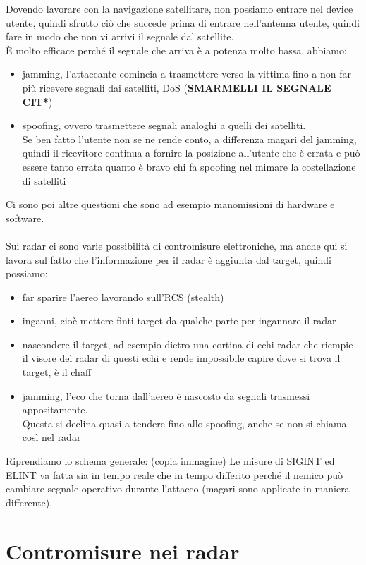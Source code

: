 \documentclass[oneside, 12pt]{extbook}
\begin{document}
Dovendo lavorare con la navigazione satellitare, non possiamo entrare nel device utente, quindi sfrutto ciò che succede prima di entrare nell'antenna utente, quindi fare in modo che non vi arrivi il segnale dal satellite.\\
È molto efficace perché il segnale che arriva è a potenza molto bassa, abbiamo:
\begin{itemize}
	\item jamming, l'attaccante comincia a trasmettere verso la vittima fino a non far più ricevere segnali dai satelliti, DoS (\textbf{SMARMELLI IL SEGNALE CIT*})
	\item spoofing, ovvero trasmettere segnali analoghi a quelli dei satelliti.\\
	Se ben fatto l'utente non se ne rende conto, a differenza magari del jamming, quindi il ricevitore continua a fornire la posizione all'utente che è errata e può essere tanto errata quanto è bravo chi fa spoofing nel mimare la costellazione di satelliti
\end{itemize}
Ci sono poi altre questioni che sono ad esempio manomissioni di hardware e software.\\\\
Sui radar ci sono varie possibilità di contromisure elettroniche, ma anche qui si lavora sul fatto che l'informazione per il radar è aggiunta dal target, quindi possiamo:
\begin{itemize}
	\item far sparire l'aereo lavorando sull'RCS (stealth)
	\item inganni, cioè mettere finti target da qualche parte per ingannare il radar
	\item nascondere il target, ad esempio dietro una cortina di echi radar che riempie il visore del radar di questi echi e rende impossibile capire dove si trova il target, è il chaff
	\item jamming, l'eco che torna dall'aereo è nascosto da segnali trasmessi appositamente.\\
	Questa si declina quasi a tendere fino allo spoofing, anche se non si chiama così nel radar
\end{itemize}
Riprendiamo lo schema generale: (copia immagine)
Le misure di SIGINT ed ELINT va fatta sia in tempo reale che in tempo differito perché il nemico può cambiare segnale operativo durante l'attacco (magari sono applicate in maniera differente).\\

\section{Contromisure nei radar}
\end{document}
